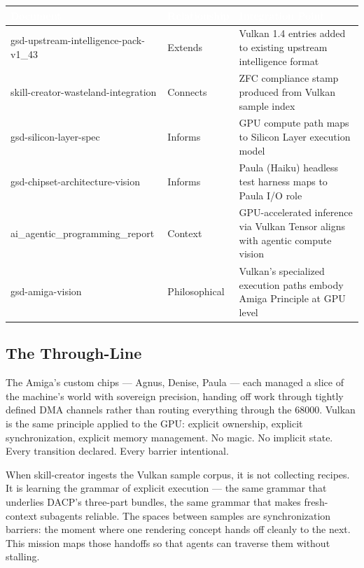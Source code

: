 \documentclass[11pt,letterpaper]{article}
\newcommand{\tableheader}[1]{\textbf{\sffamily\textcolor{white}{#1}}}
\begin{document}
\begin{center}
\begin{tabularx}{\textwidth}{L{4cm}L{3cm}X}
\toprule
{}
\tableheader{Document} & \tableheader{Relationship} & \tableheader{Integration Point} \\
\midrule
gsd-upstream-intelligence-pack-v1\_43 & Extends & Vulkan 1.4 entries added to existing upstream intelligence format \\
skill-creator-wasteland-integration & Connects & ZFC compliance stamp produced from Vulkan sample index \\
gsd-silicon-layer-spec & Informs & GPU compute path maps to Silicon Layer execution model \\
gsd-chipset-architecture-vision & Informs & Paula (Haiku) headless test harness maps to Paula I/O role \\
ai\_agentic\_programming\_report & Context & GPU-accelerated inference via Vulkan Tensor aligns with agentic compute vision \\
gsd-amiga-vision & Philosophical & Vulkan's specialized execution paths embody Amiga Principle at GPU level \\
\bottomrule
\end{tabularx}
\end{center}

\subsection{The Through-Line}

The Amiga's custom chips --- Agnus, Denise, Paula --- each managed a slice of the machine's world with sovereign precision, handing off work through tightly defined DMA channels rather than routing everything through the 68000. Vulkan is the same principle applied to the GPU: explicit ownership, explicit synchronization, explicit memory management. No magic. No implicit state. Every transition declared. Every barrier intentional.

When skill-creator ingests the Vulkan sample corpus, it is not collecting recipes. It is learning the grammar of explicit execution --- the same grammar that underlies DACP's three-part bundles, the same grammar that makes fresh-context subagents reliable. The spaces between samples are synchronization barriers: the moment where one rendering concept hands off cleanly to the next. This mission maps those handoffs so that agents can traverse them without stalling.
\end{document}
